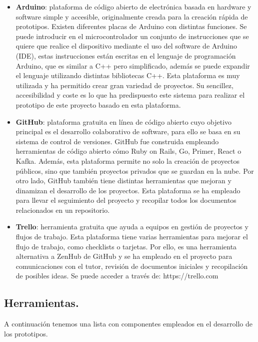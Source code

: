 \begin{itemize}
\item \textbf{Arduino}\cite{Arduino1, Arduino2}: plataforma de código abierto de electrónica basada en hardware y software simple y accesible, originalmente creada para la creación rápida de prototipos. Existen diferentes placas de Arduino con distintas funciones. Se puede introducir en el microcontrolador un conjunto de instrucciones que se quiere que realice el dispositivo mediante el uso del software de Arduino (IDE), estas instrucciones están escritas en el lenguaje de programación Arduino, que es similar a C++ pero simplificado, además se puede expandir el lenguaje utilizando distintas bibliotecas C++. Esta plataforma es muy utilizada y ha permitido crear gran variedad de proyectos. Su sencillez, accesibilidad y coste es lo que ha predispuesto este sistema para realizar el prototipo de este proyecto basado en esta plataforma. 

\item \textbf{GitHub}\cite{GitHub}: plataforma gratuita en línea de código abierto cuyo objetivo principal es el desarrollo colaborativo de software, para ello se basa en su sistema de control de versiones. GitHub fue construida empleando herramientas de código abierto cómo  Ruby on Rails, Go, Primer, React o Kafka. Además, esta plataforma permite no solo la creación de proyectos públicos, sino que también proyectos privados que se guardan en la nube. Por otro lado, GitHub también tiene distintas herramientas que mejoran y dinamizan el desarrollo de los proyectos. Esta plataforma se ha empleado para llevar el seguimiento del proyecto y recopilar todos los documentos relacionados en un repositorio.

\item \textbf{Trello}\cite{Trello}: herramienta gratuita que ayuda a equipos en gestión de proyectos y flujos de trabajo. Esta plataforma tiene varias herramientas para mejorar el flujo de trabajo, como checklists o tarjetas. Por ello, es una herramienta alternativa a ZenHub de GitHub y se ha empleado en el proyecto para comunicaciones con el tutor, revisión de documentos iniciales y recopilación de posibles ideas. Se puede acceder a través de: https://trello.com

\end{itemize}

\subsection{Herramientas.}
A continuación tenemos una lista con componentes empleados en el desarrollo de los prototipos.

